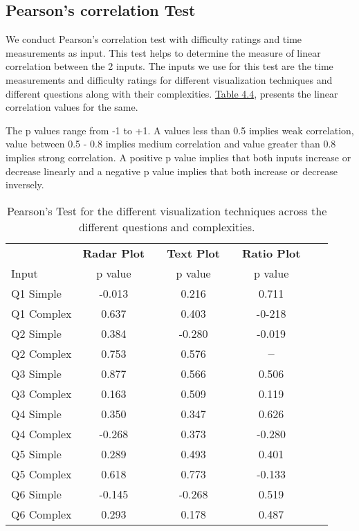 \subsection{Pearson's correlation Test}
We conduct Pearson's correlation test with difficulty ratings and time measurements as input. This test helps to determine the measure of linear correlation between the 2 inputs. The inputs we use for this test are the time measurements and difficulty ratings for different visualization techniques and different questions along with their complexities. \hyperref[table:pearons]{Table 4.4}, presents the linear correlation values for the same.

The p values range from -1 to +1. A values less than 0.5 implies weak correlation, value between 0.5 - 0.8 implies medium correlation and value greater than 0.8 implies strong correlation. A positive p value implies that both inputs increase or decrease linearly and a negative p value implies that both increase or decrease inversely.

\begin{table}[!htbp]
\centering
\begin{tabular}{@{\extracolsep{4pt}}lccccccc}
\toprule   
{} & \textbf{Radar Plot} &   &   \textbf{Text Plot} &   &  \textbf{Ratio Plot}\\
 \cmidrule{2-3} 
 \cmidrule{4-5} 
  \cmidrule{6-7} 
Input  & p value &  & p value &  & p value \\
\midrule
Q1 Simple  & -0.013 &  & 0.216 &  & 0.711 & \\ 
Q1 Complex & 0.637 &  & 0.403 &  & -0-218 & \\ 
Q2 Simple  & 0.384 &  & -0.280 &  & -0.019 & \\ 
Q2 Complex & 0.753 &  & 0.576 &  & \textbf{--} & \\ 
Q3 Simple  & 0.877 &  & 0.566 &  & 0.506 & \\ 
Q3 Complex & 0.163 &  & 0.509 &  & 0.119 & \\ 
Q4 Simple  & 0.350 &  & 0.347 &  & 0.626 &\\ 
Q4 Complex & -0.268 &  & 0.373 &  & -0.280 &\\ 
Q5 Simple  & 0.289 &  & 0.493 &  & 0.401 &\\ 
Q5 Complex & 0.618 &  & 0.773 &  & -0.133 &\\ 
Q6 Simple  & -0.145 &  & -0.268  &  & 0.519 &\\ 
Q6 Complex & 0.293 &  & 0.178  &  & 0.487 &\\ 
\bottomrule
\end{tabular}
\label{table:pearons}
\caption[Difficulty Rating]{Pearson's Test for the different visualization techniques across the different questions and complexities.} 
\end{table}

